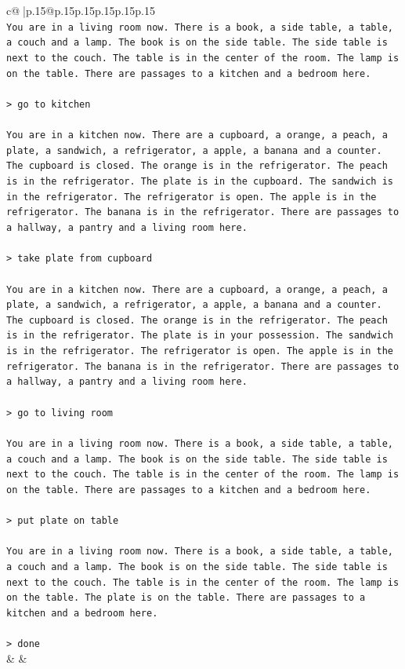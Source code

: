 \documentclass{article}
\begin{document}
{\begin{supertabular}{c@{$\;$}|p{.15\linewidth}@{}p{.15\linewidth}p{.15\linewidth}p{.15\linewidth}p{.15\linewidth}p{.15\linewidth}}
{{{\\ 
\texttt{You are in a living room now. There is a book, a side table, a table, a couch and a lamp. The book is on the side table. The side table is next to the couch. The table is in the center of the room. The lamp is on the table. There are passages to a kitchen and a bedroom here.} \\
\\ 
\texttt{> go to kitchen} \\
\\ 
\texttt{You are in a kitchen now. There are a cupboard, a orange, a peach, a plate, a sandwich, a refrigerator, a apple, a banana and a counter. The cupboard is closed. The orange is in the refrigerator. The peach is in the refrigerator. The plate is in the cupboard. The sandwich is in the refrigerator. The refrigerator is open. The apple is in the refrigerator. The banana is in the refrigerator. There are passages to a hallway, a pantry and a living room here.} \\
\\ 
\texttt{> take plate from cupboard} \\
\\ 
\texttt{You are in a kitchen now. There are a cupboard, a orange, a peach, a plate, a sandwich, a refrigerator, a apple, a banana and a counter. The cupboard is closed. The orange is in the refrigerator. The peach is in the refrigerator. The plate is in your possession. The sandwich is in the refrigerator. The refrigerator is open. The apple is in the refrigerator. The banana is in the refrigerator. There are passages to a hallway, a pantry and a living room here.} \\
\\ 
\texttt{> go to living room} \\
\\ 
\texttt{You are in a living room now. There is a book, a side table, a table, a couch and a lamp. The book is on the side table. The side table is next to the couch. The table is in the center of the room. The lamp is on the table. There are passages to a kitchen and a bedroom here.} \\
\\ 
\texttt{> put plate on table} \\
\\ 
\texttt{You are in a living room now. There is a book, a side table, a table, a couch and a lamp. The book is on the side table. The side table is next to the couch. The table is in the center of the room. The lamp is on the table. The plate is on the table. There are passages to a kitchen and a bedroom here.} \\
\\ 
\texttt{> done} \\
            }
        }
    }
    & & \\ \\


\end{supertabular}}
\end{document}
